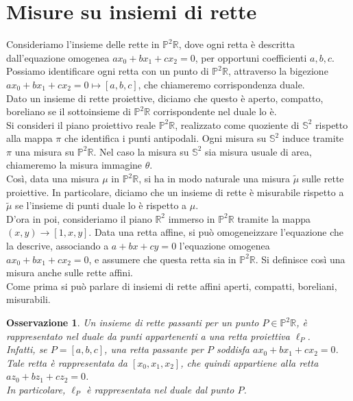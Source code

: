 \documentclass[a4paper, twoside]{article}
\newcommand{\ra}{\rightarrow}
\newcommand{\R}{\mathbb{R}}
\renewcommand{\P}{\mathbb{P}}
\renewcommand{\S}{\mathbb{S}}
\newcommand{\<}{\langle}
\renewcommand{\>}{\rangle}
\newtheorem{oss}[teo]{Osservazione}
\begin{document}
	\newpage


\section{Misure su insiemi di rette}
Consideriamo l'insieme delle rette in $\P^2 \R$, dove ogni retta è descritta dall'equazione omogenea $ax_0+bx_1+cx_2=0$, per opportuni coefficienti $a,b,c$.\\
Possiamo identificare ogni retta con un punto di $\P^2 \R$, attraverso la bigezione $ax_0+bx_1+cx_2=0 \mapsto [a,b,c]$, che chiameremo corrispondenza duale.\\
Dato un insieme di rette proiettive, diciamo che questo è aperto, compatto, boreliano se il sottoinsieme di $\P^2 \R$ corrispondente nel duale lo è.\\

Si consideri il piano proiettivo reale $\P^2 \R$, realizzato come quoziente di $\S^2$ rispetto alla mappa $\pi$ che identifica i punti antipodali. Ogni misura su $\S^2$ induce tramite $\pi$ una misura su $\P^2\R$. Nel caso la misura su $\S^2$ sia misura usuale di area, chiameremo la misura immagine $\theta$.\\
Così, data una misura $\mu$ in $\P^2 \R$, si ha in modo naturale una misura $\tilde \mu$ sulle rette proiettive. In particolare, diciamo che un insieme di rette è misurabile rispetto a $\tilde \mu$ se l'insieme di punti duale lo è rispetto a $\mu$.\\

D'ora in poi, consideriamo il piano $\R^2$ immerso in $\P^2 \R$ tramite la mappa $(x,y) \ra [1,x,y]$. Data una retta affine, si può omogeneizzare l'equazione che la descrive, associando a $a+bx+cy=0$ l'equazione omogenea $ax_0+bx_1+cx_2=0$, e assumere che questa retta sia in $\P^2 \R$. Si definisce così una misura anche sulle rette affini.\\
Come prima si può parlare di insiemi di rette affini aperti, compatti, boreliani, misurabili.

\begin{oss}
	\label{osservazione}
	Un insieme di rette passanti per un punto $P \in \P^2 \R$, è rappresentato nel duale da punti appartenenti a una retta proiettiva $\ell_P$.\\
	Infatti, se $P=[a,b,c]$, una retta passante per $P$ soddisfa $ax_0+bx_1+cx_2=0$. Tale retta è rappresentata da $[x_0,x_1,x_2]$, che quindi appartiene alla retta $az_0+bz_1+cz_2=0$.\\
	In particolare, $\ell_P$ è rappresentata nel duale dal punto $P$.
\end{oss}
\end{document}
